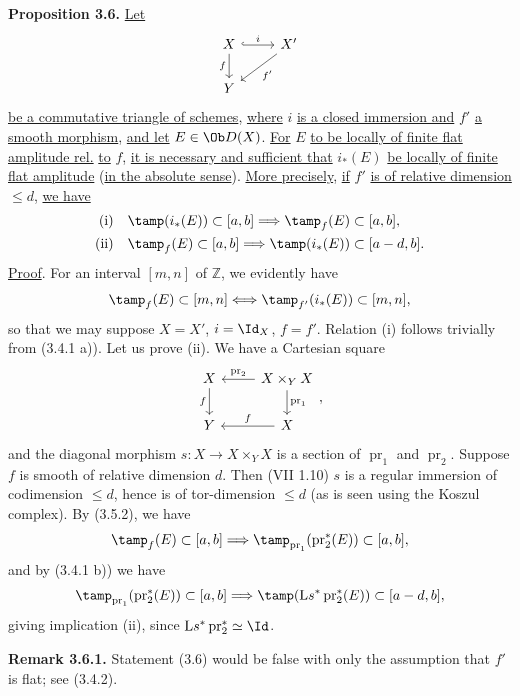 %
\textbf{Proposition 3.6.} \uline{Let}
\[
\begin{tikzcd}
X \arrow[r,hook,"i"] \arrow[d,"f"'] & X' \arrow[dl,"f'"]\\
Y &
\end{tikzcd}
\]
\uline{be a commutative triangle of schemes}, \uline{where} \(i\) \uline{is a closed immersion and} \(f'\) \uline{a smooth morphism}, \uline{and let} \(E\in\Ob D(X)\). \uline{For} \(E\) \uline{to be locally of finite flat amplitude rel.} \uline{to} \(f\), \uline{it is necessary and sufficient that} \(i_*(E)\) \uline{be locally of finite flat amplitude} (\uline{in the absolute sense}). \uline{More precisely}, \uline{if} \(f'\) \uline{is of relative dimension} \(\leq d\), \uline{we have}
\begin{align*}
\text{(i)}\quad &\tamp(i_*(E))\subset[a,b] \Longrightarrow \tamp_f(E)\subset[a,b],\\
\text{(ii)}\quad &\tamp_f(E)\subset[a,b] \Longrightarrow \tamp(i_*(E))\subset[a-d,b].
\end{align*}
%
\uline{Proof}. For an interval \([m,n]\) of \(\mathbb Z\), we evidently have
\[
 \tamp_f(E)\subset[m,n]
 \Longleftrightarrow
 \tamp_{f'}(i_*(E))\subset[m,n],
\]
so that we may suppose \(X=X'\), \(i=\Id_X\), \(f=f'\). Relation (i) follows trivially from (3.4.1 a)). Let us prove (ii). We have a Cartesian square
\[
\begin{tikzcd}
X \arrow[d,"f"'] & X\times_Y X \arrow[l,"\operatorname{pr}_2"'] \arrow[d,"\operatorname{pr}_1"]\\
Y & X \arrow[l,"f"']
\end{tikzcd},
\]
and the diagonal morphism \(s:X\longrightarrow X\times_YX\) is a section of \(\operatorname{pr}_1\) and \(\operatorname{pr}_2\). Suppose \(f\) is smooth of relative dimension \(d\). Then (VII 1.10) \(s\) is a regular immersion of codimension \(\leq d\), hence is of tor-dimension \(\leq d\) (as is seen using the Koszul complex). By (3.5.2), we have
\[
 \tamp_f(E)\subset[a,b]
 \Longrightarrow
 \tamp_{\operatorname{pr}_1}(\operatorname{pr}_2^*(E))\subset[a,b],
\]
and by (3.4.1 b)) we have
\[
 \tamp_{\operatorname{pr}_1}(\operatorname{pr}_2^*(E))\subset[a,b]
 \Longrightarrow
 \tamp(\mathrm Ls^*\operatorname{pr}_2^*(E))\subset[a-d,b],
\]
giving implication (ii), since \(\mathrm Ls^*\operatorname{pr}_2^*\simeq\Id\).

\textbf{Remark 3.6.1.} Statement (3.6) would be false with only the assumption that \(f'\) is flat; see (3.4.2).

